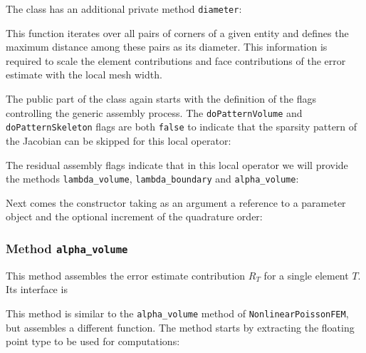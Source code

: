 \documentclass[a4paper,12pt]{article}
\begin{document}
The class has an additional private method \lstinline{diameter}:

This function iterates over all pairs of corners of a given entity and defines
the maximum distance among these pairs as its diameter. This information is
required to scale the element contributions and face contributions of the
error estimate with the local mesh width.

The public part of the class again starts with the definition of the flags controlling
the generic assembly process. The \lstinline{doPatternVolume} and
\lstinline{doPatternSkeleton} flags are both \lstinline{false} to indicate that
the sparsity pattern of the Jacobian can be skipped for this local operator:


The residual assembly flags indicate that in this local operator we will provide
the methods \lstinline{lambda_volume}, \lstinline{lambda_boundary}
and \lstinline{alpha_volume}:


Next comes the constructor taking as an argument a reference to a
parameter object and the optional increment of the quadrature order:


\subsubsection*{Method \lstinline{alpha_volume}}

This method assembles the error estimate contribution $R_T$ for a single element $T$.
Its interface is


This method is similar to the \lstinline{alpha_volume} method of
\lstinline{NonlinearPoissonFEM}, but assembles a different function.
The method starts by extracting the floating point type to be used for
computations:

\end{document}
